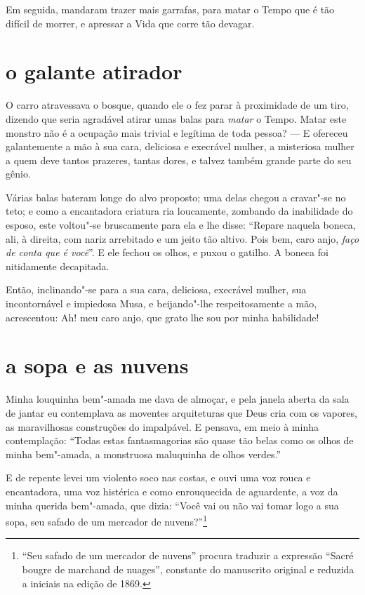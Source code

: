Em seguida, mandaram trazer mais garrafas, para matar o Tempo que é tão difícil de morrer, e apressar a Vida que corre tão devagar.

\quebra\section[O galante atirador]{o galante atirador}

O carro atravessava o bosque, quando ele o fez parar à proximidade de um
tiro, dizendo que seria agradável atirar umas balas para \textit{matar} o
Tempo. Matar este monstro não é a ocupação mais trivial e legítima de
toda pessoa? --- E ofereceu galantemente a mão à sua cara, deliciosa e
execrável mulher, a misteriosa mulher a quem deve tantos prazeres,
tantas dores, e talvez também grande parte do seu gênio.

Várias balas bateram longe do alvo proposto; uma delas chegou a cravar"-se
no teto; e como a encantadora criatura ria loucamente, zombando da
inabilidade do esposo, este voltou"-se bruscamente para ela e lhe
disse: “Repare naquela boneca, ali, à direita, com
nariz arrebitado e um jeito tão altivo. Pois bem, caro anjo, \textit{faço de
conta que é você}''. E ele fechou os olhos, e puxou o
gatilho. A boneca foi nitidamente decapitada.

Então, inclinando"-se para a sua cara, deliciosa, execrável mulher, sua
incontornável e impiedosa Musa, e beijando"-lhe respeitosamente a mão,
acrescentou: Ah! meu caro anjo, que grato lhe sou por
minha habilidade!

\quebra\section[A sopa e as nuvens]{a sopa e as nuvens}

Minha louquinha bem"-amada me dava de almoçar, e pela janela aberta da
sala de jantar eu contemplava as moventes arquiteturas que Deus cria com
os vapores, as maravilhosas construções do impalpável. E pensava,
em meio à minha contemplação: “Todas estas
fantasmagorias são quase tão belas como os olhos de minha
bem"-amada, a monstruosa maluquinha de olhos verdes.”

E de repente levei um violento soco nas costas, e ouvi uma voz rouca e
encantadora, uma voz histérica e como enrouquecida de aguardente,
a voz da minha querida bem"-amada, que dizia: “Você
vai ou não vai tomar logo a sua sopa, seu safado de um mercador de
nuvens?''\protect\footnote{ “Seu safado de um mercador de nuvens'' 
procura traduzir a expressão “Sacré bougre de marchand de
nuages'', constante do manuscrito original e reduzida a
iniciais na edição de 1869.}

